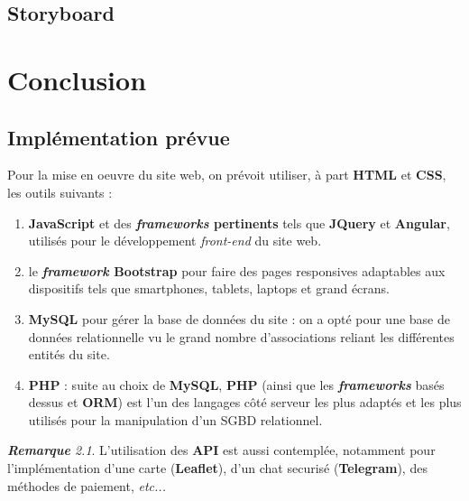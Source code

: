 \documentclass[a4paper,12pt]{book}
\theoremstyle{break}
\theoremstyle{break}
\theoremstyle{break}
\theoremstyle{break}
\theoremstyle{definition}
\theoremstyle{remark}
\newtheorem*{remark}{\textbf{Remarque}}
\begin{document}
\section{Storyboard}

\chapter{Conclusion}
\section{Implémentation prévue}
Pour la mise en oeuvre du site web, on prévoit utiliser, à part \textbf{HTML} et \textbf{CSS}, les outils suivants :
\begin{enumerate}
  \item{\textbf{JavaScript} et des \textbf{\textit{frameworks} pertinents} tels que \textbf{JQuery} et \textbf{Angular}, utilisés pour le développement \textit{front-end} du site web.}
  \item{le \textbf{\textit{framework} Bootstrap} pour faire des pages responsives adaptables aux dispositifs tels que smartphones, tablets, laptops et grand écrans.}
  \item{\textbf{MySQL} pour gérer la base de données du site : on a opté pour une base de données relationnelle vu le grand nombre d'associations reliant les différentes entités du site.}
  \item{\textbf{PHP} : suite au choix de \textbf{MySQL}, \textbf{PHP} (ainsi que les \textbf{\textit{frameworks}} basés dessus et \textbf{ORM}) est l'un des langages côté serveur les plus adaptés et les plus utilisés pour la manipulation d'un SGBD relationnel.}
\end{enumerate}

\begin{remark}
L'utilisation des \textbf{API} est aussi contemplée, notamment pour l'implémentation d'une carte (\textbf{Leaflet}), d'un chat securisé (\textbf{Telegram}), des méthodes de paiement, \textit{etc...}
\end{remark}
\end{document}
